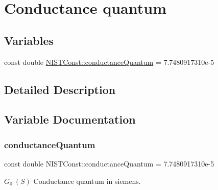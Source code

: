 \hypertarget{group___conductance_quantum}{}\section{Conductance quantum}
\label{group___conductance_quantum}
\subsection*{Variables}
\begin{DoxyCompactItemize}
\item 
const double \hyperlink{group___conductance_quantum_gac57088a56b37d0b899d3e9c9babaadaf}{N\+I\+S\+T\+Const\+::conductance\+Quantum} = 7.\+7480917310e-\/5
\end{DoxyCompactItemize}


\subsection{Detailed Description}


\subsection{Variable Documentation}
\mbox{\label{group___conductance_quantum_gac57088a56b37d0b899d3e9c9babaadaf}} 
\subsubsection{\texorpdfstring{conductance\+Quantum}{conductanceQuantum}}
{\footnotesize\ttfamily const double N\+I\+S\+T\+Const\+::conductance\+Quantum = 7.\+7480917310e-\/5}

$G_0 \ (S)$ Conductance quantum in siemens. 